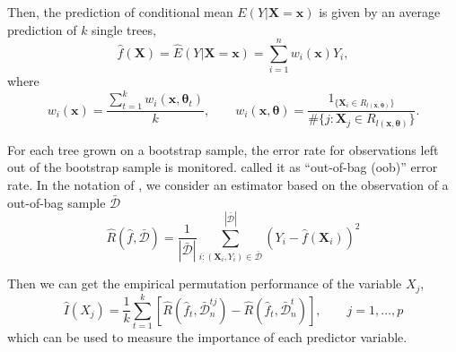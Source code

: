 \documentclass[11pt,titlepage]{article}
\begin{document}
	Then, the prediction of conditional mean $E(Y|\mathbf{X}=\mathbf{x})$ is given by an average prediction of $k$ single trees, %
	\begin{equation}\label{eq:conexpectation}
	\hat{f}(\mathbf{X})=\hat{E}(Y|\mathbf{X}=\mathbf{x})=\sum_{i=1}^{n}w_{i}(\mathbf{x})Y_{i},
	\end{equation}
	where
	\begin{equation}\label{eq:singletreepredw}
	w_{i}(\mathbf{x})=\frac{\sum_{t=1}^{k}w_{i}(\mathbf{x},\boldsymbol{\theta}_{t})}{k}, \qquad{w_{i}(\mathbf{x},\boldsymbol{\theta})=\frac{1_{\{ 	\mathbf{X}_{i} \in R_{l(\mathbf{x},\boldsymbol{\theta})} \}}}{\# \{ j: \mathbf{X}_{j} \in R_{l(\mathbf{x},\boldsymbol{\theta})} \}} }.
	\end{equation}
	
	For each tree grown on a bootstrap sample, the error rate for observations left out of the bootstrap sample is monitored. \citep{Breiman2001} called it as  “out-of-bag (oob)” error rate. In the notation of \citep{Gregorutti2017}, we consider an estimator based on the observation of a out-of-bag sample $\bar{\mathcal{D}}$
	\begin{equation}
	\hat{R}(\hat{f}, \bar{\mathcal{D}})=\frac{1}{|\bar{\mathcal{D}}|}\sum_{i:(\mathbf{X}_{i},Y_{i})\in\bar{\mathcal{D}}}^{|\bar{\mathcal{D}}|}(Y_{i}-\hat{f}(\mathbf{X}_{i}))^{2}
	\end{equation}
	
	Then we can get the empirical permutation performance of the variable $X_{j}$,
	\begin{equation}
	\hat{I}(X_{j})=\frac{1}{k}\sum_{t=1}^{k}[\hat{R}(\hat{f}_{t}, \bar{\mathcal{D}}_{n}^{tj})-\hat{R}(\hat{f}_{t},\bar{\mathcal{D}}_{n}^{t}) ], \qquad{j=1,\ldots, p}
	\end{equation}
	which can be used to measure the importance of each predictor variable.
	
	
	
	
\end{document}
